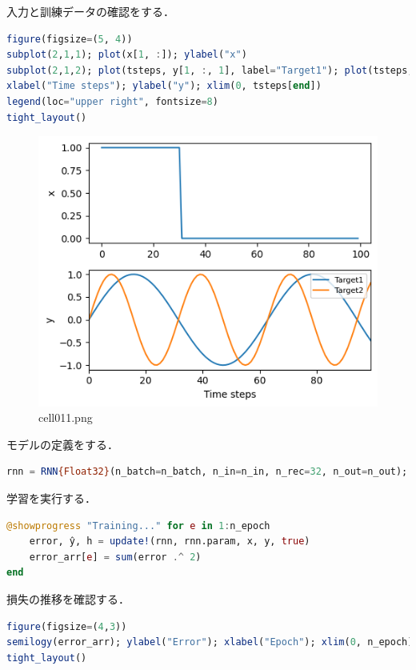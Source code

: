 入力と訓練データの確認をする．
\begin{lstlisting}[language=julia]
figure(figsize=(5, 4))
subplot(2,1,1); plot(x[1, :]); ylabel("x")
subplot(2,1,2); plot(tsteps, y[1, :, 1], label="Target1"); plot(tsteps, y[1, :, 2], label="Target2")
xlabel("Time steps"); ylabel("y"); xlim(0, tsteps[end])
legend(loc="upper right", fontsize=8)
tight_layout()
\end{lstlisting}
\begin{figure}[ht]
	\centering
	\includegraphics[scale=0.8, max width=\linewidth]{./fig/solve-credit-assignment-problem/bptt/cell011.png}
	\caption{cell011.png}
	\label{cell011.png}
\end{figure}
モデルの定義をする．
\begin{lstlisting}[language=julia]
rnn = RNN{Float32}(n_batch=n_batch, n_in=n_in, n_rec=32, n_out=n_out);
\end{lstlisting}
学習を実行する．
\begin{lstlisting}[language=julia]
@showprogress "Training..." for e in 1:n_epoch
    error, ŷ, h = update!(rnn, rnn.param, x, y, true)
    error_arr[e] = sum(error .^ 2)
end
\end{lstlisting}
損失の推移を確認する．
\begin{lstlisting}[language=julia]
figure(figsize=(4,3))
semilogy(error_arr); ylabel("Error"); xlabel("Epoch"); xlim(0, n_epoch)
tight_layout()
\end{lstlisting}
